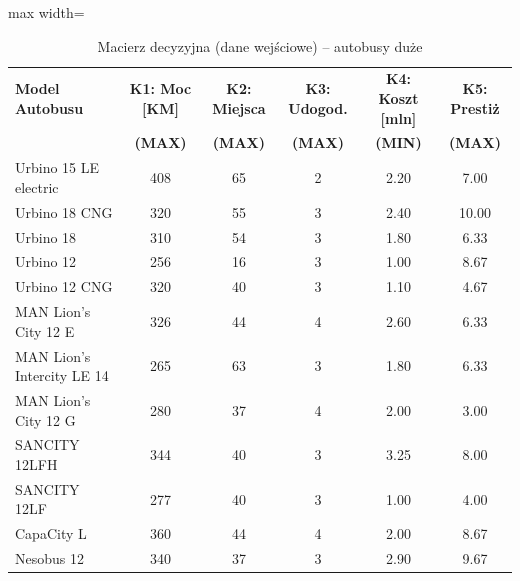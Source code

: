 \begin{table}[H]
    \centering
    \caption{Macierz decyzyjna (dane wejściowe) -- autobusy duże}
    \vspace{0.2cm}
    \begin{adjustbox}{max width=\textwidth}
    \begin{tabular}{|l|c|c|c|c|c|}
        \hline
        \textbf{Model Autobusu} & \textbf{K1: Moc [KM]} & \textbf{K2: Miejsca} & \textbf{K3: Udogod.} & \textbf{K4: Koszt [mln]} & \textbf{K5: Prestiż} \\ 
        & \textbf{(MAX)} & \textbf{(MAX)} & \textbf{(MAX)} & \textbf{(MIN)} & \textbf{(MAX)} \\ \hline
        Urbino 15 LE electric & 408 & 65 & 2 & 2.20 & 7.00 \\ \hline
        Urbino 18 CNG & 320 & 55 & 3 & 2.40 & 10.00 \\ \hline
        Urbino 18 & 310 & 54 & 3 & 1.80 & 6.33 \\ \hline
        Urbino 12 & 256 & 16 & 3 & 1.00 & 8.67 \\ \hline
        Urbino 12 CNG & 320 & 40 & 3 & 1.10 & 4.67 \\ \hline
        MAN Lion's City 12 E & 326 & 44 & 4 & 2.60 & 6.33 \\ \hline
        MAN Lion's Intercity LE 14 & 265 & 63 & 3 & 1.80 & 6.33 \\ \hline
        MAN Lion's City 12 G & 280 & 37 & 4 & 2.00 & 3.00 \\ \hline
        SANCITY 12LFH & 344 & 40 & 3 & 3.25 & 8.00 \\ \hline
        SANCITY 12LF & 277 & 40 & 3 & 1.00 & 4.00 \\ \hline
        CapaCity L & 360 & 44 & 4 & 2.00 & 8.67 \\ \hline
        Nesobus 12 & 340 & 37 & 3 & 2.90 & 9.67 \\ \hline
    \end{tabular}
    \end{adjustbox}
\end{table}

